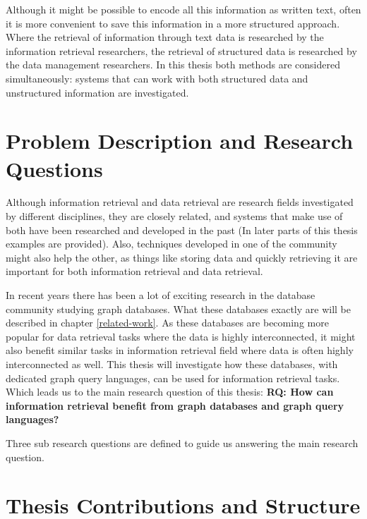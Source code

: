 Although it might be possible to encode all this information as written text, often it is more convenient to save this information in a more structured approach. Where the retrieval of information through text data is researched by the information retrieval researchers, the retrieval of structured data is researched by the data management researchers. In this thesis both methods are considered simultaneously: systems that can work with both structured data and unstructured information are investigated.

\section{Problem Description and Research Questions}
Although information retrieval and data retrieval are research fields investigated by different disciplines, they are closely related, and systems that make use of both have been researched and developed in the past (In later parts of this thesis examples are provided). Also, techniques developed in one of the community might also help the other, as things like storing data and quickly retrieving it are important for both information retrieval and data retrieval. 

In recent years there has been a lot of exciting research in the database community studying graph databases. What these databases exactly are will be described in chapter \ref{related-work}. As these databases are becoming more popular for data retrieval tasks where the data is highly interconnected, it might also benefit similar tasks in information retrieval field where data is often highly interconnected as well. This thesis will investigate how these databases, with dedicated graph query languages, can be used for information retrieval tasks. Which leads us to the main research question of this thesis: \textbf{RQ: How can information retrieval benefit from graph databases and graph query languages?}

Three sub research questions are defined to guide us answering the main research question. 

\section{Thesis Contributions and Structure}

